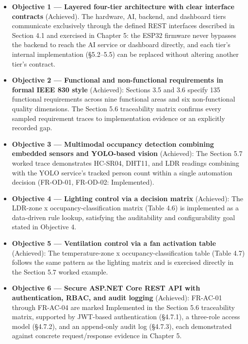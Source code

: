 \begin{itemize}
	\item \textbf{Objective 1 --- Layered four-tier architecture with clear interface contracts} (Achieved). The hardware, AI, backend, and dashboard tiers communicate exclusively through the defined REST interfaces described in Section 4.1 and exercised in Chapter 5: the ESP32 firmware never bypasses the backend to reach the AI service or dashboard directly, and each tier's internal implementation (§5.2--5.5) can be replaced without altering another tier's contract.

	\item \textbf{Objective 2 --- Functional and non-functional requirements in formal IEEE 830 style} (Achieved): Sections 3.5 and 3.6 specify 135 functional requirements across nine functional areas and six non-functional quality dimensions. The Section 5.6 traceability matrix confirms every sampled requirement traces to implementation evidence or an explicitly recorded gap.

	\item \textbf{Objective 3 --- Multimodal occupancy detection combining embedded sensors and YOLO-based vision} (Achieved): The Section 5.7 worked trace demonstrates HC-SR04, DHT11, and LDR readings combining with the YOLO service's tracked person count within a single automation decision (FR-OD-01, FR-OD-02: Implemented).

	\item \textbf{Objective 4 --- Lighting control via a decision matrix} (Achieved): The LDR-zone x occupancy-classification matrix (Table 4.6) is implemented as a data-driven rule lookup, satisfying the auditability and configurability goal stated in Objective 4.

	\item \textbf{Objective 5 --- Ventilation control via a fan activation table} (Achieved): The temperature-zone x occupancy-classification table (Table 4.7) follows the same pattern as the lighting matrix and is exercised directly in the Section 5.7 worked example.

	\item \textbf{Objective 6 --- Secure ASP.NET Core REST API with authentication, RBAC, and audit logging} (Achieved): FR-AC-01 through FR-AC-04 are marked Implemented in the Section 5.6 traceability matrix, supported by JWT-based authentication (§4.7.1), a three-role access model (§4.7.2), and an append-only audit log (§4.7.3), each demonstrated against concrete request/response evidence in Chapter 5.


\end{itemize}
